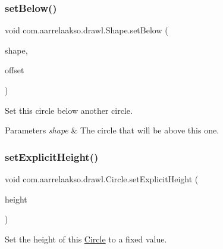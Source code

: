 \subsubsection{\texorpdfstring{set\+Below()}{setBelow()}\hspace{0.1cm}{\footnotesize\ttfamily [2/2]}}
{\footnotesize\ttfamily void com.\+aarrelaakso.\+drawl.\+Shape.\+set\+Below (\begin{DoxyParamCaption}\item[{\hyperlink{classcom_1_1aarrelaakso_1_1drawl_1_1_shape}{Shape}}]{shape,  }\item[{\hyperlink{classcom_1_1aarrelaakso_1_1drawl_1_1_measure}{Measure}}]{offset }\end{DoxyParamCaption})\hspace{0.3cm}{\ttfamily [inherited]}}



Set this circle below another circle. 


\begin{DoxyParams}{Parameters}
{\em shape} & The circle that will be above this one. \\
\hline
\end{DoxyParams}
\mbox{\label{classcom_1_1aarrelaakso_1_1drawl_1_1_circle_ab9d522fa3ba3c5ba770486a89d321159}} 
\subsubsection{\texorpdfstring{set\+Explicit\+Height()}{setExplicitHeight()}}
{\footnotesize\ttfamily void com.\+aarrelaakso.\+drawl.\+Circle.\+set\+Explicit\+Height (\begin{DoxyParamCaption}\item[{@Nullable \hyperlink{classcom_1_1aarrelaakso_1_1drawl_1_1_drawl_number}{Drawl\+Number}}]{height }\end{DoxyParamCaption})\hspace{0.3cm}{\ttfamily [protected]}}



Set the height of this \hyperlink{classcom_1_1aarrelaakso_1_1drawl_1_1_circle}{Circle} to a fixed value. 


